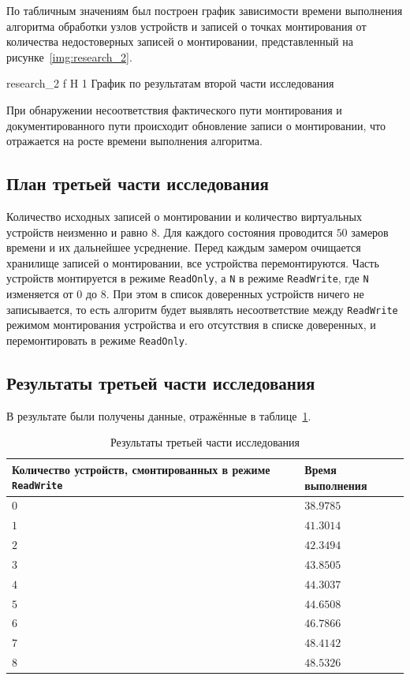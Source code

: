 По табличным значениям был построен график зависимости времени выполнения алгоритма обработки узлов устройств и 
записей о точках монтирования от количества недостоверных записей о монтировании, представленный на рисунке~\ref{img:research_2}.

    {research_2}
    {f}
    {H}
    {1\textwidth}
    {График по результатам второй части исследования}

При обнаружении несоответствия фактического пути монтирования и документированного пути происходит обновление записи о монтировании, 
что отражается на росте времени выполнения алгоритма. 

\subsection{План третьей части исследования}

Количество исходных записей о монтировании и количество виртуальных устройств неизменно и равно $8$.
Для каждого состояния проводится $50$ замеров времени и их дальнейшее усреднение.
Перед каждым замером очищается хранилище записей о монтировании, все устройства перемонтируются.
Часть устройств монтируется в режиме \texttt{ReadOnly}, а \texttt{N} в режиме \texttt{ReadWrite},
где \texttt{N} изменяется от $0$ до $8$. При этом в список доверенных устройств ничего не записывается, то
есть алгоритм будет выявлять несоответствие между \texttt{ReadWrite} режимом монтирования устройства и его отсутствия
в списке доверенных, и перемонтировать в режиме \texttt{ReadOnly}.

\subsection{Результаты третьей части исследования}

В результате были получены данные, отражённые в таблице~\ref{tab:res_3}.

\begin{table}[H]
    \caption{Результаты третьей части исследования}
    \begin{tabular}{|p{10cm}|p{5cm}|}
    \hline

    \textbf{Количество устройств, смонтированных в режиме \texttt{ReadWrite}}
    & \textbf{Время выполнения} \\
    \hline

    $0$ & $38.9785$ \\ \hline
    $1$ & $41.3014$ \\ \hline
    $2$ & $42.3494$ \\ \hline
    $3$ & $43.8505$ \\ \hline
    $4$ & $44.3037$ \\ \hline
    $5$ & $44.6508$ \\ \hline
    $6$ & $46.7866$ \\ \hline
    $7$ & $48.4142$ \\ \hline
    $8$ & $48.5326$ \\ \hline

    \end{tabular}
    \label{tab:res_3}
\end{table}

